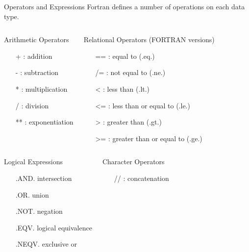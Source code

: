 \documentclass[10pt,t]{beamer}
\begin{document}
\begin{frame}{Operators and Expressions}
  Fortran defines a number of operations on each data type.
  \begin{columns}[t]
    \begin{eblock}{\scriptsize Arithmetic Operators}
      \begin{itemize}
        \footnotesize
        \item[+]: addition
        \item[-]: subtraction
        \item[*]: multiplication
        \item[/]: division
        \item[**]: exponentiation
      \end{itemize}
    \end{eblock}
    \begin{eblock}{\scriptsize Relational Operators (FORTRAN versions)}
      \begin{itemize}
        \footnotesize
        \item[==]: equal to (.eq.)
        \item[/=]: not equal to (.ne.)
        \item[<]: less than (.lt.)
        \item[<=]: less than or equal to (.le.)
        \item[>]: greater than (.gt.)
        \item[>=]: greater than or equal to (.ge.)
      \end{itemize}
    \end{eblock}
  \end{columns}
  \begin{columns}[t]
    \begin{eblock}{\scriptsize Logical Expressions}
      \begin{itemize}
        \footnotesize
        \item[]{\color{lubrown}.AND.} intersection
        \item[]{\color{lubrown}.OR.} union
        \item[]{\color{lubrown}.NOT.} negation
        \item[]{\color{lubrown}.EQV.} logical equivalence
        \item[]{\color{lubrown}.NEQV.} exclusive or
      \end{itemize}
    \end{eblock}
    \begin{eblock}{\scriptsize Character Operators}
      \begin{itemize}
        \footnotesize
        \item[//]: concatenation
      \end{itemize}
    \end{eblock}
  \end{columns}
\end{frame}
\end{document}
